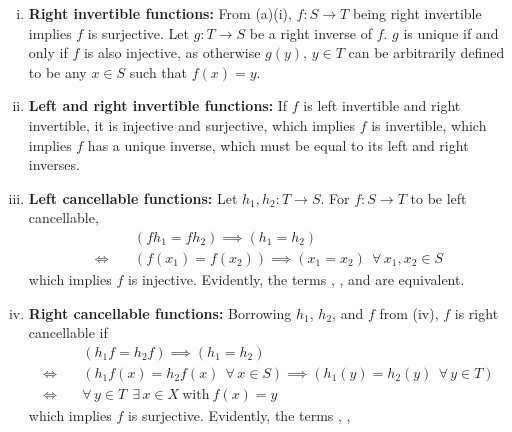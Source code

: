 \documentclass[12pt]{article}
\begin{document}
\begin{enumerate}[(a)]
\begin{enumerate}[(i)]
                  \item {\bf Right invertible functions:}
                        From (a)(i), $f: S \rightarrow T$ being right invertible implies $f$ is surjective. Let $g:T\rightarrow S$
                        be a right inverse of $f$. $g$ is unique if and only if $f$ is also injective, as otherwise $g(y),\, y\in T$ can be arbitrarily defined to
                        be any $x \in S$ such that $f(x) = y$.
                  \item {\bf Left and right invertible functions:}
                        If $f$ is left invertible and right invertible, it is injective and surjective,
                        which implies $f$ is invertible, which implies $f$ has a unique inverse, which must be
                        equal to its left and right inverses.
                  \item {\bf Left cancellable functions:} Let $h_1, h_2: T \rightarrow S$. For
                        $f:S \rightarrow T$
                        to be left cancellable,
                        \begin{align*}
                                                        & (fh_1 = fh_2) \implies (h_1 = h_2)                                  \\
                              \Longleftrightarrow \quad & (f(x_1) = f(x_2)) \implies (x_1 = x_2) \ \ \forall \,x_1, x_2 \in S
                        \end{align*}
                        which implies $f$ is injective. Evidently, the terms , ,
                        and  are equivalent.
                  \item {\bf Right cancellable functions:} Borrowing $h_1$, $h_2$, and $f$ from (iv), $f$
                        is right cancellable if
                        \begin{align*}
                                                        & (h_1f = h_2f) \implies (h_1 = h_2)                                                       \\
                              \Longleftrightarrow \quad & (h_1f(x) = h_2f(x)\ \ \forall \,x \in S) \implies (h_1(y) = h_2(y)\ \ \forall \,y \in T) \\
                              \Longleftrightarrow \quad & \forall \,y \in T \ \ \exists \,x \in X \ \text{with}\  f(x) = y
                        \end{align*}
                        which implies $f$ is surjective. Evidently, the terms , ,

\end{enumerate}
\end{enumerate}
\end{document}
